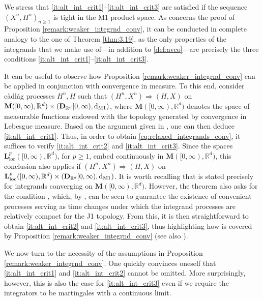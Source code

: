 \documentclass[11pt]{article}
\theoremstyle{definition}\newtheorem{example}[theorem]{Example}
\theoremstyle{definition}\newtheorem{counterexample}[theorem]{Counterexample}
\theoremstyle{definition}\newtheorem{remark}[theorem]{Remark}
\theoremstyle{definition}\newtheorem{defi}[theorem]{Definition}
\numberwithin{equation}{section}
\newcommand{\R}{\mathbb{R}}
\newcommand{\D}{{\bf D}}											%
\newcommand*\diff{\mathop{}\!\mathrm{d}}								%
\renewcommand{\|}{\; : \, \;}											%
\newcommand{\dM}{\diff_{\operatorname{M1}}}							%
\begin{document}
We stress that \eqref{it:alt_int_crit1}--\eqref{it:alt_int_crit3} are satisfied if the sequence $(X^n, H^n)_{n\geq1}$ is tight in the M1 product space. As concerns the proof of Proposition \ref{remark:weaker_integrnd_conv}, it can be conducted in complete analogy to the one of Theorem \ref{thm:3.19}, as the only properties of the integrands that we make use of---in addition to \eqref{def:avco}---are precisely the three conditions \eqref{it:alt_int_crit1}--\eqref{it:alt_int_crit3}.

It can be useful to observe how Proposition \ref{remark:weaker_integrnd_conv} can be applied in conjunction with convergence in measure. To this end, consider càdlàg processes $H^n,H$ such that $(H^n,X^n) \Rightarrow (H,X)$ on $\textbf{M}([0,\infty), \R^d) \times (\D_{\R^{d}}[0,\infty), \dM)$, where $\textbf{M}([0,\infty), \R^d)$ denotes the space of measurable functions endowed with the topology generated by convergence in Lebesgue measure. Based on the argument given in \cite[pp.364-365]{meyerzheng}, one can then deduce \eqref{it:alt_int_crit1}. Thus, in order to obtain \eqref{eq:relaxed_integrands_conv}, it suffices to verify \eqref{it:alt_int_crit2} and \eqref{it:alt_int_crit3}. Since the spaces $\textbf{L}_{\text{loc}}^p([0,\infty), \R^d)$, for $p\ge 1$, embed continuously in $\textbf{M}([0,\infty), \R^d)$, this conclusion also applies if $(H^n,X^n) \Rightarrow (H,X)$ on $\textbf{L}_{\text{loc}}^p([0,\infty), \R^d) \times (\D_{\R^{d}}[0,\infty), \dM)$. It is worth recalling that \cite[Thm.~4.7]{kurtzprotter} is stated precisely for integrands converging on $\textbf{M}([0,\infty), \R^d)$. However, the theorem also asks for the condition \cite[(C4.1)]{kurtzprotter}, which, by \cite[Cor. 1.3]{kurtz}, can be seen to guarantee the existence of convenient processes serving as time changes under which the integrand processes are relatively compact for the J1 topology. From this, it is then straightforward to obtain \eqref{it:alt_int_crit2} and \eqref{it:alt_int_crit3}, thus highlighting how \cite[Thm.~4.7]{kurtzprotter} is covered by Proposition \ref{remark:weaker_integrnd_conv} (see also \cite[Rmk. 3 and Rmk. 4]{jakubowski}).

We now turn to the necessity of the assumptions in Proposition \ref{remark:weaker_integrnd_conv}. One quickly convinces oneself that \eqref{it:alt_int_crit1} and \eqref{it:alt_int_crit2} cannot be omitted. More surprisingly, however, this is also the case for \eqref{it:alt_int_crit3} even if we require the integrators to be martingales with a continuous limit.
\end{document}
